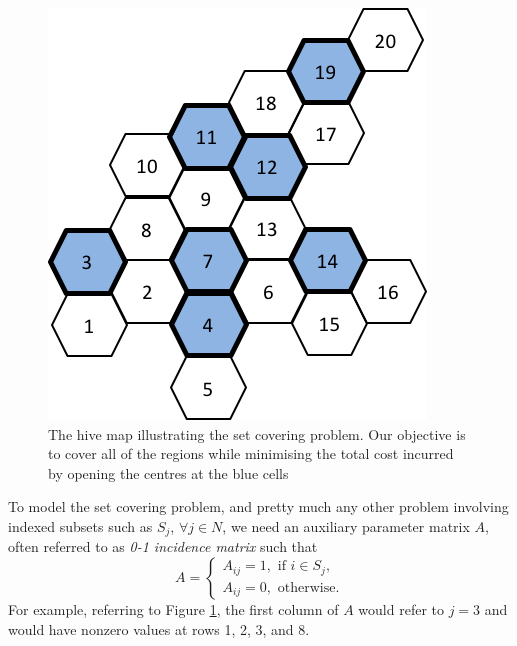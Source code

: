 \begin{figure}[h]
	\centering
	\includegraphics[scale=0.8]{chapters/chapter_8/figures/hive_setcover.png}
	\caption{The hive map illustrating the set covering problem. Our objective is to cover all of the regions while minimising the total cost incurred by opening the centres at the blue cells} \label{p1c8:fig:set_covering}
\end{figure}

To model the set covering problem, and pretty much any other problem involving indexed subsets such as $S_j$, $\forall j \in N$, we need an auxiliary parameter matrix $A$, often referred to as \emph{0-1 incidence matrix} such that
%
\begin{equation*}
	A = \begin{cases}
		A_{ij} = 1, \text{ if } i \in S_j, \\
		A_{ij} = 0, \text{ otherwise.}
	\end{cases}
\end{equation*}
%
For example, referring to Figure \ref{p1c8:fig:set_covering}, the first column of $A$ would refer to $j = 3$ and would have nonzero values at rows 1, 2, 3, and 8.

